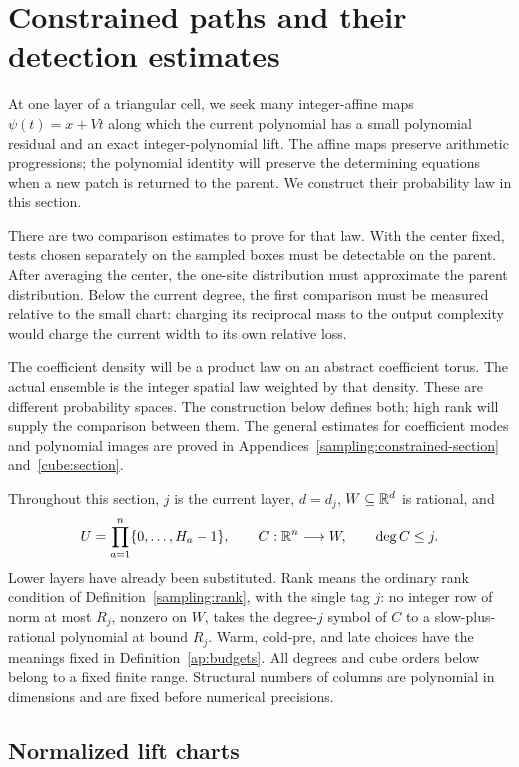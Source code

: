 \section{Constrained paths and their detection estimates}\label{ap:paths}

At one layer of a triangular cell, we seek many integer-affine maps
$\psi(t)=x+Vt$ along which the current polynomial has a small
polynomial residual and an exact integer-polynomial lift. The affine
maps preserve arithmetic progressions; the polynomial identity will
preserve the determining equations when a new patch is returned to
the parent. We construct their probability law in this section.

There are two comparison estimates to prove for that law. With the
center fixed, tests chosen separately on the sampled boxes must be
detectable on the parent. After averaging the center, the one-site
distribution must approximate the parent distribution. Below the
current degree, the first comparison must be measured relative to
the small chart: charging its reciprocal mass to the output
complexity would charge the current width to its own relative loss.

The coefficient density will be a product law on an abstract
coefficient torus. The actual ensemble is the integer spatial law
weighted by that density. These are different probability spaces.
The construction below defines both; high rank will supply the
comparison between them. The general estimates for coefficient
modes and polynomial images are proved in
Appendices~\ref{sampling:constrained-section} and~\ref{cube:section}.

Throughout this section, $j$ is the current layer, $d=d_j$,
$W\subseteq\mathbb R^d$ is rational, and
\[
 U=\prod_{a=1}^n\{0,\ldots,H_a-1\},\qquad
 C: \mathbb R^n\longrightarrow W,\qquad \deg C\le j.
\]
Lower layers have already been substituted.  Rank means the ordinary
rank condition of Definition~\ref{sampling:rank}, with the single tag
$j$: no integer row of norm at most $R_j$, nonzero on $W$, takes the
degree-$j$ symbol of $C$ to a slow-plus-rational polynomial at bound
$R_j$.  Warm, cold-pre, and late choices have the meanings fixed in
Definition~\ref{ap:budgets}.  All degrees and cube orders below belong to a
fixed finite range.  Structural numbers of columns are polynomial in
dimensions and are fixed before numerical precisions.

\subsection{Normalized lift charts}

